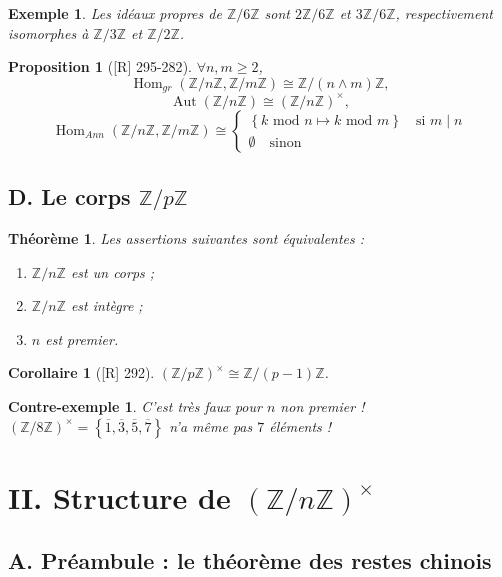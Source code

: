 \documentclass[10pt, a4paper, parskip=full, twoside, twocolumn]{report}
\newtheorem{theorem}[definition]{Théorème}
\newtheorem{proposition}[definition]{Proposition}
\newtheorem{corollary}[definition]{Corollaire}
\newtheorem{example}[definition]{Exemple}
\newtheorem{cexample}[definition]{Contre-exemple}
\newcommand{\IZ}{\mathbb{Z}}
\newcommand{\IZnZ}{\mathbb{Z}/n\mathbb{Z}}
\DeclareMathOperator{\Hom}{Hom}
\DeclareMathOperator{\Aut}{Aut}
\begin{document}
\begin{example}
	Les idéaux propres de $\IZ/6\IZ$ sont $2\IZ/6\IZ$ et $3\IZ/6\IZ$, respectivement isomorphes à $\IZ/3\IZ$ et $\IZ/2\IZ$.
\end{example}

\begin{proposition}[\textnormal{[R] 295-282}]
	$\forall n,m\geq 2$, 
	$$\Hom_{gr}(\IZnZ, \IZ/m\IZ)\cong \IZ/(n\wedge m)\IZ,$$
	$$\Aut(\IZnZ)\cong \left(\IZnZ\right)^{\times},$$
	$$\Hom_{Ann}(\IZnZ, \IZ/m\IZ)\cong  \begin{cases}
		\left\{k\text{ mod } n \mapsto k \text{ mod } m\right\} \quad\text{si } m\mid n \\
		\emptyset\quad\text{sinon}
	\end{cases}$$
\end{proposition}

\subsection*{D. Le corps $\IZ/p\IZ$}
\begin{theorem}
	Les assertions suivantes sont équivalentes :
	\begin{enumerate}
		\item $\IZnZ$ est un corps ;
		\item $\IZnZ$ est intègre ;
		\item $n$ est premier.
	\end{enumerate}
\end{theorem}

\begin{corollary}[\textnormal{[R] 292}]
	$\left(\IZ/p\IZ\right)^{\times} \cong \IZ/(p-1)\IZ$.
\end{corollary}

\begin{cexample}
	C'est très faux pour $n$ non premier !
	$\left(\IZ/8\IZ\right)^{\times} = \left\{\overline{1},\overline{3},\overline{5},\overline{7}\right\}$ n'a même pas $7$ éléments !
\end{cexample}

\section*{II. Structure de $\left(\IZnZ\right)^{\times}$}
\subsection*{A. Préambule : le théorème des restes chinois}
\end{document}
